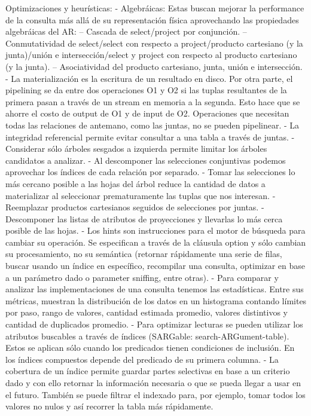 Optimizaciones y heurísticas:
- Algebráicas: Estas buscan mejorar la performance de la consulta más allá de su representación física aprovechando las propiedades algebráicas del AR:
-- Cascada de select/project por conjunción.
-- Conmutatividad de select/select con respecto a project/producto cartesiano (y la junta)/unión e intersección/select y project con respecto al producto cartesiano (y la junta).
-- Asociatividad del producto cartesiano, junta, unión e intersección.
- La materialización es la escritura de un resultado en disco. Por otra parte, el pipelining se da entre dos operaciones O1 y O2 si las tuplas resultantes de la primera pasan a través de un stream en memoria a la segunda. Esto hace que se ahorre el costo de output de O1 y de input de O2. Operaciones que necesitan todas las relaciones de antemano, como las juntas, no se pueden pipelinear.
- La integridad referencial permite evitar consultar a una tabla a través de juntas.
- Considerar sólo árboles sesgados a izquierda permite limitar los árboles candidatos a analizar.
- Al descomponer las selecciones conjuntivas podemos aprovechar los índices de cada relación por separado.
- Tomar las selecciones lo más cercano posible a las hojas del árbol reduce la cantidad de datos a materializar al seleccionar prematuramente las tuplas que nos interesan.
- Reemplazar productos cartesianos seguidos de selecciones por juntas.
- Descomponer las listas de atributos de proyecciones y llevarlas lo más cerca posible de las hojas.
- Los hints son instrucciones para el motor de búsqueda para cambiar su operación. Se especifican a través de la cláusula option y sólo cambian su procesamiento, no su semántica (retornar rápidamente una serie de filas, buscar usando un índice en específico, recompilar una consulta, optimizar en base a un parámetro dado o parameter sniffing, entre otras).
- Para comparar y analizar las implementaciones de una consulta tenemos las estadísticas. Entre sus métricas, muestran la distribución de los datos en un histograma contando límites por paso, rango de valores, cantidad estimada promedio, valores distintivos y cantidad de duplicados promedio.
- Para optimizar lecturas se pueden utilizar los atributos buscables a través de índices (SARGable: search-ARGument-table). Estos se aplican sólo cuando los predicados tienen condiciones de inclusión. En los índices compuestos depende del predicado de su primera columna.
- La cobertura de un índice permite guardar partes selectivas en base a un criterio dado y con ello retornar la información necesaria o que se pueda llegar a usar en el futuro. También se puede filtrar el indexado para, por ejemplo, tomar todos los valores no nulos y así recorrer la tabla más rápidamente.
